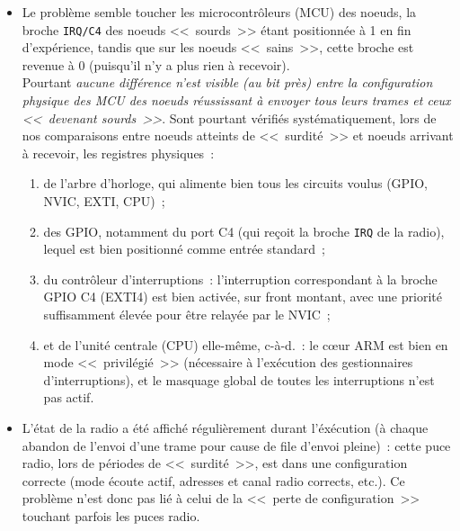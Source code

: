 \begin{itemize}
\begin{itemize}
  \item Le problème semble toucher les microcontrôleurs (MCU) des noeuds,
  la broche \texttt{IRQ/C4} des noeuds <<~sourds~>> étant positionnée à 1
  en fin d'expérience, tandis que sur les noeuds <<~sains~>>, cette
  broche est revenue à 0 (puisqu'il n'y a plus rien à recevoir). \\
  Pourtant \emph{aucune différence n'est visible (au bit près) entre la
  configuration physique des MCU des noeuds réussissant à envoyer tous
  leurs trames et ceux <<~devenant sourds~>>}. Sont pourtant vérifiés
  systématiquement, lors de nos comparaisons entre noeuds atteints de
  <<~surdité~>> et noeuds arrivant à recevoir, les registres physiques~:
    \begin{enumerate}
    \item de l'arbre d'horloge, qui alimente bien tous les circuits voulus
          (GPIO, NVIC, EXTI, CPU)~;
    \item des GPIO, notamment du port C4 (qui reçoit la broche \texttt{IRQ}
          de la radio), lequel est bien positionné comme entrée standard~;
    \item du contrôleur d'interruptions~: l'interruption correspondant à
          la broche GPIO C4 (EXTI4) est bien activée, sur front montant, avec
          une priorité suffisamment élevée pour être relayée par le NVIC~;
    \item et de l'unité centrale (CPU) elle-même, c-à-d.~: le c{\oe}ur ARM
          est bien en mode <<~privilégié~>> (nécessaire à l'exécution des
          gestionnaires d'interruptions), et le masquage global de toutes
          les interruptions n'est pas actif.
    \end{enumerate}

  \item L'état de la radio a été affiché régulièrement durant l'éxécution
  (à chaque abandon de l'envoi d'une trame pour cause de file d'envoi
  pleine)~: cette puce radio, lors de périodes de <<~surdité~>>, est dans
  une configuration correcte (mode écoute actif, adresses et canal radio
  corrects, etc.). Ce problème n'est donc pas lié à celui de la <<~perte
  de configuration~>> touchant parfois les puces radio.


\end{itemize}
\end{itemize}
